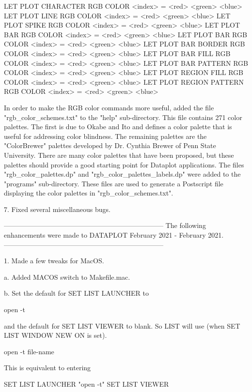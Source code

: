         LET PLOT CHARACTER       RGB COLOR <index> = <red> <green> <blue>
        LET PLOT LINE            RGB COLOR <index> = <red> <green> <blue>
        LET PLOT SPIKE           RGB COLOR <index> = <red> <green> <blue>
        LET PLOT BAR             RGB COLOR <index> = <red> <green> <blue>
        LET PLOT BAR             RGB COLOR <index> = <red> <green> <blue>
        LET PLOT BAR BORDER      RGB COLOR <index> = <red> <green> <blue>
        LET PLOT BAR FILL        RGB COLOR <index> = <red> <green> <blue>
        LET PLOT BAR PATTERN     RGB COLOR <index> = <red> <green> <blue>
        LET PLOT REGION FILL     RGB COLOR <index> = <red> <green> <blue>
        LET PLOT REGION PATTERN  RGB COLOR <index> = <red> <green> <blue>

    In order to make the RGB color commands more useful, added the file
    "rgb_color_schemes.txt" to the "help" sub-directory.  This file
    contains 271 color palettes.  The first is due to Okabe and Ito and
    defines a color palette that is useful for addressing color blindness.
    The remaining palettes are the "ColorBrewer" palettes developed by
    Dr. Cynthia Brewer of Penn State University.  There are many color
    palettes that have been proposed, but these palettes should provide
    a good starting point for Dataplot applications.  The files
    "rgb_color_palettes.dp" and "rgb_color_palettes_labels.dp" were added
    to the "programs" sub-directory.  These files are used to generate
    a Postscript file displaying the color palettes in
    "rgb_color_schemes.txt".

 7. Fixed several miscellaneous bugs.

-----------------------------------------------------------------------
The following enhancements were made to DATAPLOT
February 2021 - February 2021.
-----------------------------------------------------------------------

 1. Made a few tweaks for MacOS.

    a. Added MACOS switch to Makefile.mac.

    b. Set the default for SET LIST LAUNCHER to

           open -t

       and the default for SET LIST VIEWER to blank.  So LIST
       will use (when SET LIST WINDOW NEW ON is set).

           open -t file-name

       This is equivalent to entering

           SET LIST LAUNCHER "open -t"
           SET LIST VIEWER

